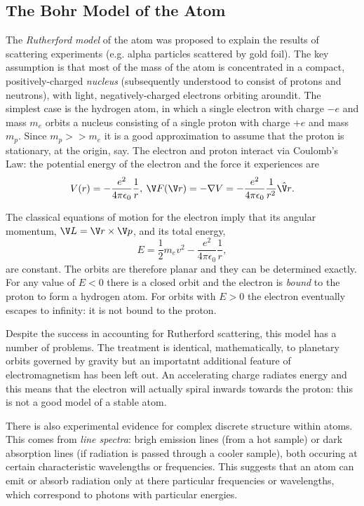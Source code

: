 \documentclass[a4paper]{article}
\begin{document}
\subsection{The Bohr Model of the Atom}

The \emph{Rutherford model} of the atom was proposed to explain the results of scattering experiments (e.g. alpha particles scattered by gold foil). The key assumption is that most of the mass of the atom is concentrated in a compact, positively-charged \emph{nucleus} (subsequently understood to consist of protons and neutrons), with light, negatively-charged electrons orbiting aroundit. The simplest case is the hydrogen atom, in which a single electron with charge $-e$ and mass $m_e$ orbits a nucleus consisting of a single proton with charge $+e$ and mass $m_p$. Since $m_p >> m_e$ it is a good approximation to assume that the proton is stationary, at the origin, say. The electron and proton interact via Coulomb's Law: the potential energy of the electron and the force it experiences are
\[
  V(r) = -\frac{e^2}{4\pi \epsilon_0} \frac{1}{r},\: \V F(\V r) = -\nabla V = -\frac{e^2}{4\pi \epsilon_0}\frac{1}{r^2} \hat{\V r}.
\]

The classical equations of motion for the electron imply that its angular momentum, $\V L = \V r \times \V p$, and its total energy,
\[
  E=\frac{1}{2}m_e v^2 - \frac{e^2}{4\pi\epsilon_0}\frac{1}{r},
\]
are constant. The orbits are therefore planar and they can be determined exactly. For any value of $E<0$ there is a closed orbit and the electron is \emph{bound} to the proton to form a hydrogen atom. For orbits with $E>0$ the electron eventually escapes to infinity: it is not bound to the proton.

Despite the success in accounting for Rutherford scattering, this model has a number of problems. The treatment is identical, mathematically, to planetary orbits governed by gravity but an importatnt additional feature of electromagnetism has been left out. An accelerating charge radiates energy and this means that the electron will actually spiral inwards towards the proton: this is not a good model of a stable atom.

There is also experimental evidence for complex discrete structure within atoms. This comes from \emph{line spectra}: brigh emission lines (from a hot sample) or dark absorption lines (if radiation is passed through a cooler sample), both occuring at certain characteristic wavelengths or frequencies. This suggests that an atom can emit or absorb radiation only at there particular frequencies or wavelengths, which correspond to photons with particular energies.
\end{document}
